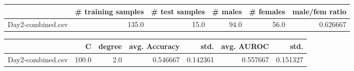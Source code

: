 \begin{tabular}{lrrrrr}
\hline
{} &  \# training samples &  \# test samples &  \# males &  \# females &  male/fem ratio \\
\hline
Day2-combined.csv &               135.0 &            15.0 &     94.0 &       56.0 &        0.626667 \\
\hline
\end{tabular}
\begin{tabular}{lrrrrrr}
\hline
{} &      C &  degree &  avg. Accuracy &      std. &  avg. AUROC &      std. \\
\hline
Day2-combined.csv &  100.0 &     2.0 &       0.546667 &  0.142361 &    0.557667 &  0.151327 \\
\hline
\end{tabular}

